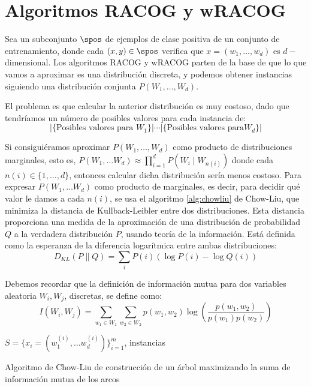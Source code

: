 \section{Algoritmos RACOG y wRACOG}
Sea un subconjunto $\spos$ de ejemplos de clase positiva de un conjunto de entrenamiento, donde cada $(x,y)\in \spos$ 
verifica que $x = (w_1, \ldots, w_d)$ es $d-$dimensional. Los algoritmos RACOG y wRACOG parten de la base de que lo que vamos
a aproximar es una distribución discreta, y podemos obtener instancias siguiendo una distribución 
conjunta $P(W_1, \ldots, W_d)$.

El problema es que calcular la anterior distribución es muy costoso, dado que tendríamos un número de posibles valores para 
cada instancia de:
\[
  |\{\textrm{Posibles valores para }W_1\}| \cdots |\{\textrm{Posibles valores para} W_d\}|
\]

Si consiguiéramos aproximar $P(W_1, \ldots, W_d)$ como producto de distribuciones marginales, esto es, 
$P(W_1, \ldots W_d) \approx \prod_{i=1}^d P(W_i \mid W_{n(i)})$ donde cada $n(i) \in \{1, \ldots, d\}$,
entonces calcular dicha distribución sería menos costoso. Para expresar $P(W_1, \ldots W_d)$ como producto de marginales,
es decir, para decidir qué valor le damos a cada $n(i)$, se usa el algoritmo \ref{alg:chowliu} de Chow-Liu,
que minimiza la distancia de Kullback-Leibler entre dos distribuciones. Esta distancia proporciona una medida de la 
aproximación de una distribución de probabilidad $Q$ a la verdadera distribución $P$, usando teoría de la información. 
Está definida como la esperanza de la diferencia logarítmica entre ambas distribuciones:
\[
  D_{KL}(P \parallel Q) = \sum_{i} P(i) \left(\log P(i) - \log Q(i)\right)
\]

Debemos recordar que la definición de información mutua para dos variables aleatoria $W_i, W_j$, discretas, 
se define como:
\[
  I(W_i, W_j) = \sum_{w_1\in W_1} \sum_{w_2\in W_2} p(w_1, w_2) \log\left(\frac{p(w_1,w_2)}{p(w_1) p(w_2)}\right)
\]

\begin{algorithm}[H]
\begin{algorithmic}[1]
 \REQUIRE $S = \{x_i=(w_1^{(i)}, \ldots w_d^{(i)})\}_{i=1}^m$, instancias
 \ENDFOR
\end{algorithmic}
\caption{Algoritmo de Chow-Liu de construcción de un árbol maximizando la suma de información
mutua de los arcos}
\label{alg:chowliu}
\end{algorithm}

